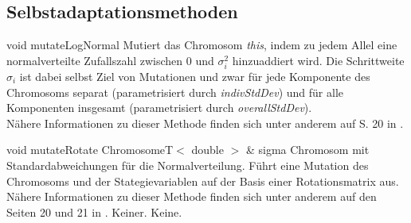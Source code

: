 \documentclass{report}
\begin{document}
\newpage


\subsection{Selbstadaptationsmethoden}

\setNormalInstance
\setCorrectWidthThree{8pt}
\printMethodWithParamsSaved
{void}
{}
{mutateLogNormal}
{Mutiert das Chromosom {\em this}, indem zu jedem Allel eine normalverteilte
 Zufallszahl zwischen 0 und $\sigma_i^2$ hinzuaddiert wird. Die Schrittweite
 $\sigma_i$ ist dabei selbst Ziel von Mutationen und zwar f\"ur jede 
 Komponente des Chromosoms
 separat (parametrisiert durch {\em indivStdDev}) und f\"ur alle
 Komponenten insgesamt 
 (parametrisiert durch {\em overallStdDev}).\\
 N\"ahere Informationen zu dieser Methode finden sich unter anderem
 auf S. 20 in \cite{EALib}.}
{}
\setCorrectWidthThree{4pt}

\vspace{4ex}

\setNormalInstance
\printMethodWithOneParam
{void}
{mutateRotate}
{ChromosomeT$<$ double $>$ \&}
{sigma}
{Chromosom mit Standardabweichungen f\"ur die Normalverteilung.}
{F\"uhrt eine Mutation des Chromosoms und der Stategievariablen auf der
 Basis einer Rotationsmatrix aus.\\
 N\"ahere Informationen zu dieser Methode finden sich unter anderem auf
 den Seiten 20 und 21 in \cite{EALib}.}
{Keiner.}
{Keine.}

\newpage
\end{document}
